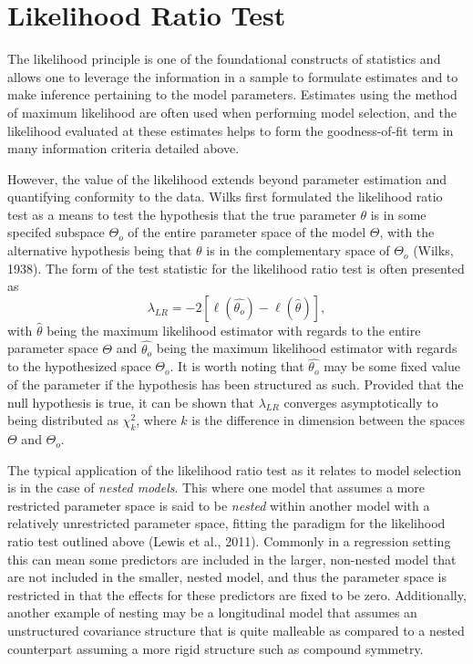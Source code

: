 		\section{Likelihood Ratio Test}

		The likelihood principle is one of the foundational constructs of statistics and allows one to leverage the information in a sample to formulate estimates and to make inference pertaining
		to the model parameters. Estimates using the method of maximum likelihood are often used when performing model selection, and the likelihood evaluated at
		these estimates helps to form the goodness-of-fit term in many information criteria detailed above.

		However, the value of the likelihood extends beyond parameter estimation and quantifying conformity to the data. Wilks first formulated the likelihood ratio test as a means to test the
		hypothesis that the true parameter $\theta$ is in some specifed subspace $\Theta_o$ of the entire parameter space of the model $\Theta$, with the alternative hypothesis being that
		$\theta$ is in the complementary space of $\Theta_o$ (Wilks, 1938). The form of the test statistic for the likelihood ratio test is often presented as
		\begin{equation}
			\lambda_{LR} = -2 \left[ \ell (\hat{\theta_o}) - \ell (\hat{\theta}) \right] ,
		\end{equation}
		with $\hat{\theta}$ being the maximum likelihood estimator with regards to the entire parameter space $\Theta$ and $\hat{\theta_o}$ being the maximum likelihood estimator with regards to the
		hypothesized space $\Theta_o$. It is worth noting that $\hat{\theta_o}$ may be some fixed value of the parameter if the hypothesis has been structured as such. Provided that the null hypothesis
		is true, it can be shown that $\lambda_{LR}$ converges asymptotically to being distributed as $\chi^2_{k}$, where $k$ is the difference in dimension between the spaces $\Theta$ and
		$\Theta_o$.

		The typical application of the likelihood ratio test as it relates to model selection is in the case of \textit{nested models}. This where one model that assumes a more restricted parameter
		space is said to be \textit{nested} within another model with a relatively unrestricted parameter space, fitting the paradigm for the likelihood ratio test outlined above (Lewis et al., 2011).
		Commonly in a regression setting this can mean some predictors are included in the larger, non-nested model that are not included in the smaller, nested model, and thus the parameter space is
		restricted in that the effects for these predictors are fixed to be zero. Additionally, another example of nesting may be a longitudinal model that assumes an unstructured covariance structure
		that is quite malleable as compared to a nested counterpart assuming a more rigid structure such as compound symmetry.

